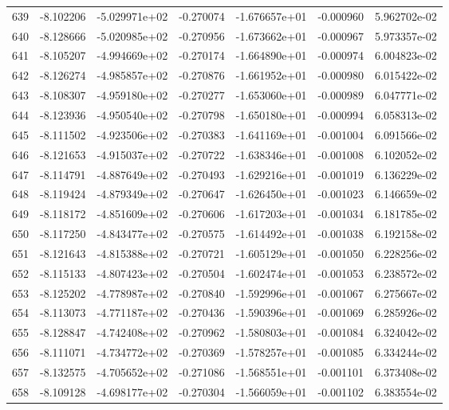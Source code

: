 \begin{tabular}{rrrrrrr}
 639 &  -8.102206 & -5.029971e+02 & -0.270074 & -1.676657e+01 &   -0.000960 &  5.962702e-02 \\
 640 &  -8.128666 & -5.020985e+02 & -0.270956 & -1.673662e+01 &   -0.000967 &  5.973357e-02 \\
 641 &  -8.105207 & -4.994669e+02 & -0.270174 & -1.664890e+01 &   -0.000974 &  6.004823e-02 \\
 642 &  -8.126274 & -4.985857e+02 & -0.270876 & -1.661952e+01 &   -0.000980 &  6.015422e-02 \\
 643 &  -8.108307 & -4.959180e+02 & -0.270277 & -1.653060e+01 &   -0.000989 &  6.047771e-02 \\
 644 &  -8.123936 & -4.950540e+02 & -0.270798 & -1.650180e+01 &   -0.000994 &  6.058313e-02 \\
 645 &  -8.111502 & -4.923506e+02 & -0.270383 & -1.641169e+01 &   -0.001004 &  6.091566e-02 \\
 646 &  -8.121653 & -4.915037e+02 & -0.270722 & -1.638346e+01 &   -0.001008 &  6.102052e-02 \\
 647 &  -8.114791 & -4.887649e+02 & -0.270493 & -1.629216e+01 &   -0.001019 &  6.136229e-02 \\
 648 &  -8.119424 & -4.879349e+02 & -0.270647 & -1.626450e+01 &   -0.001023 &  6.146659e-02 \\
 649 &  -8.118172 & -4.851609e+02 & -0.270606 & -1.617203e+01 &   -0.001034 &  6.181785e-02 \\
 650 &  -8.117250 & -4.843477e+02 & -0.270575 & -1.614492e+01 &   -0.001038 &  6.192158e-02 \\
 651 &  -8.121643 & -4.815388e+02 & -0.270721 & -1.605129e+01 &   -0.001050 &  6.228256e-02 \\
 652 &  -8.115133 & -4.807423e+02 & -0.270504 & -1.602474e+01 &   -0.001053 &  6.238572e-02 \\
 653 &  -8.125202 & -4.778987e+02 & -0.270840 & -1.592996e+01 &   -0.001067 &  6.275667e-02 \\
 654 &  -8.113073 & -4.771187e+02 & -0.270436 & -1.590396e+01 &   -0.001069 &  6.285926e-02 \\
 655 &  -8.128847 & -4.742408e+02 & -0.270962 & -1.580803e+01 &   -0.001084 &  6.324042e-02 \\
 656 &  -8.111071 & -4.734772e+02 & -0.270369 & -1.578257e+01 &   -0.001085 &  6.334244e-02 \\
 657 &  -8.132575 & -4.705652e+02 & -0.271086 & -1.568551e+01 &   -0.001101 &  6.373408e-02 \\
 658 &  -8.109128 & -4.698177e+02 & -0.270304 & -1.566059e+01 &   -0.001102 &  6.383554e-02 \\

\end{tabular}
